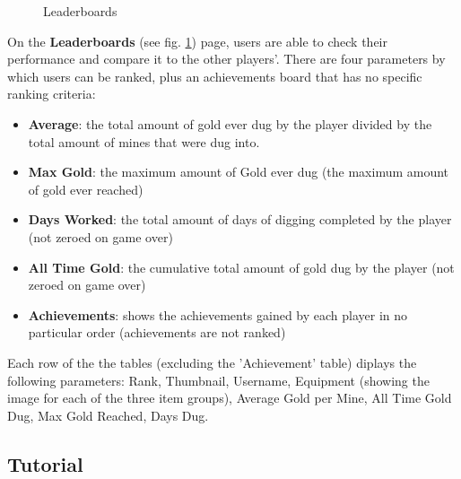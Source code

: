 \documentclass{mproj}
\begin{document}
\begin{figure} [h] 
	\centering
	\caption{Leaderboards}
           \label{fig: leaderboards}
\end{figure}

On the \textbf{Leaderboards} (see fig. \ref{fig: leaderboards}) page, users are able to check their performance and compare it to the other players'. There are four parameters by which users can be ranked, plus an achievements board that has no specific ranking criteria: 

\begin{itemize}
  	\item \textbf{Average}: the total amount of gold ever dug by the player divided by the total amount of mines that were dug into.
  	\item \textbf{Max Gold}: the maximum amount of Gold ever dug (the maximum amount of gold ever reached)
	\item \textbf{Days Worked}: the total amount of days of digging completed by the player (not zeroed on game over)
	\item \textbf{All Time Gold}: the cumulative total amount of gold dug by the player  (not zeroed on game over)
	\item \textbf{Achievements}: shows the achievements gained by each player in no particular order (achievements are not ranked)
\end{itemize} 

Each row of the the tables (excluding the 'Achievement' table) diplays the following parameters: Rank, Thumbnail, Username, Equipment (showing the image for each of the three item groups), Average Gold per Mine, All Time Gold Dug, Max Gold Reached, Days Dug.

\subsection{Tutorial}
\end{document}

